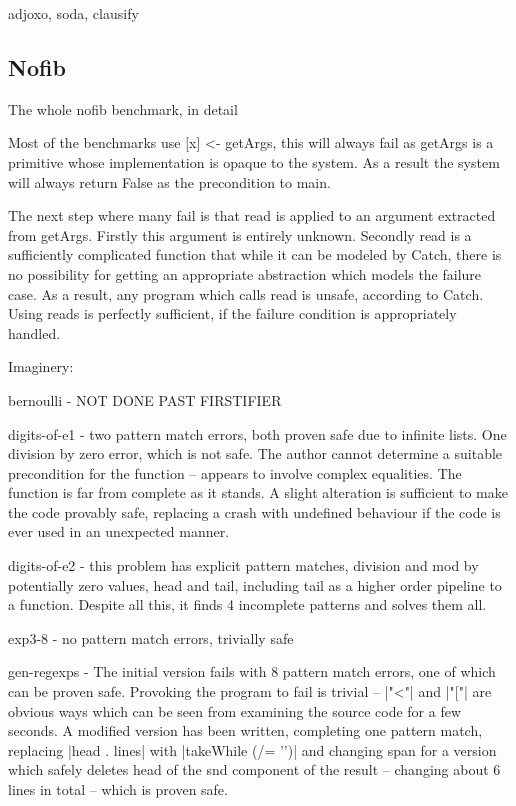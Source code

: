 \documentclass[preprint]{sigplanconf}
\newcommand{\C}[1]{\textsf{#1}}
\begin{document}
adjoxo, soda, clausify

\subsection{Nofib}

The whole nofib benchmark, in detail

Most of the benchmarks use [x] <- getArgs, this will always fail as getArgs is a primitive whose implementation is opaque to the system. As a result the system will always return False as the precondition to main.

The next step where many fail is that read is applied to an argument extracted from getArgs. Firstly this argument is entirely unknown. Secondly read is a sufficiently complicated function that while it can be modeled by Catch, there is no possibility for getting an appropriate abstraction which models the failure case. As a result, any program which calls read is unsafe, according to Catch. Using reads is perfectly sufficient, if the failure condition is appropriately handled.

Imaginery:

bernoulli - NOT DONE PAST FIRSTIFIER

digits-of-e1 - two pattern match errors, both proven safe due to infinite lists. One division by zero error, which is not safe. The author cannot determine a suitable precondition for the function -- appears to involve complex equalities. The function is far from complete as it stands. A slight alteration is sufficient to make the code provably safe, replacing a crash with undefined behaviour if the code is ever used in an unexpected manner.

digits-of-e2 - this problem has explicit pattern matches, division and mod by potentially zero values, head and tail, including tail as a higher order pipeline to a function. Despite all this, it finds 4 incomplete patterns and solves them all.

exp3-8 - no pattern match errors, trivially safe

gen-regexps - The initial version fails with 8 pattern match errors, one of which can be proven safe. Provoking the program to fail is trivial -- |"<"| and |"["| are obvious ways which can be seen from examining the source code for a few seconds. A modified version has been written, completing one pattern match, replacing |head . lines| with |takeWhile (/= '\n')| and changing \C{span} for a version which safely deletes head of the \C{snd} component of the result -- changing about 6 lines in total -- which is proven safe.
\end{document}
